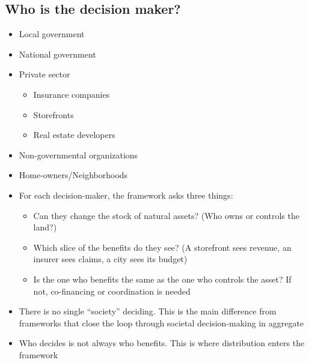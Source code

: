 \documentclass[12pt]{article}
\begin{document}
\subsection{Who is the decision maker?}
\begin{itemize}
  \item Local government
  \item National government
  \item Private sector
  \begin{itemize}
    \item Insurance companies
    \item Storefronts 
    \item Real estate developers
  \end{itemize}
  \item Non-governmental organizations
  \item Home-owners/Neighborhoods
  \item For each decision-maker, the framework asks three things:
  \begin{itemize}
    \item Can they change the stock of natural assets? (Who owns or controls the land?)
    \item Which slice of the benefits do they see? (A storefront sees revenue, an insurer sees claims, a city sees its budget)
    \item Is the one who benefits the same as the one who controls the asset? If not, co-financing or coordination is needed
  \end{itemize}
  \item There is no single ``society'' deciding. This is the main difference from frameworks that close the loop through societal decision-making in aggregate \citep{tanConceptualFrameworkUntangle2020}
  \item Who decides is not always who benefits. This is where distribution enters the framework
\end{itemize}
\end{document}
